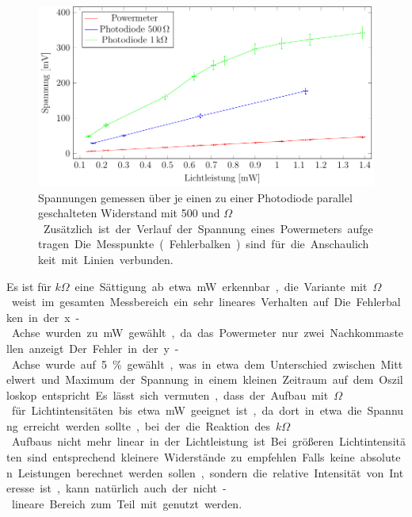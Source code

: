 \begin{figure} [ht]
	\centering
	\includegraphics[width=1\linewidth]{graphs/fotodiode/diode.pdf}
	\caption[Vermessung einer Photodiode]{
			Spannungen gemessen über je einen zu einer Photodiode parallel geschalteten Widerstand mit 500 und \unit[1000]{$\Omega$}. Zusätzlich ist der Verlauf der Spannung eines Powermeters aufgetragen. Die Messpunkte (Fehlerbalken) sind für die Anschaulichkeit mit Linien verbunden.
		}
	\label{fig:photodiode}
\end{figure}

Es ist für \unit[1]{$k\Omega$} eine Sättigung ab etwa \unit[0,9]{mW} erkennbar, die Variante mit \unit[500]{$\Omega$} weist im gesamten Messbereich ein sehr lineares Verhalten auf. Die Fehlerbalken in der x-Achse wurden zu \unit[0,01]{mW} gewählt, da das Powermeter nur zwei Nachkommastellen anzeigt. Der Fehler in der y-Achse wurde auf 5\% gewählt, was in etwa dem Unterschied zwischen Mittelwert und Maximum der Spannung in einem kleinen Zeitraum auf dem Oszilloskop entspricht.

Es lässt sich vermuten, dass der Aufbau mit \unit[500]{$\Omega$} für Lichtintensitäten bis etwa \unit[1,5]{mW} geeignet ist, da dort in etwa die Spannung erreicht werden sollte, bei der die Reaktion des \unit[1]{$k\Omega$} Aufbaus nicht mehr linear in der Lichtleistung ist. Bei größeren Lichtintensitäten sind entsprechend kleinere Widerstände zu empfehlen. Falls keine absoluten Leistungen berechnet werden sollen, sondern die relative Intensität von Interesse ist, kann natürlich auch der nicht-lineare Bereich zum Teil mit genutzt werden.

